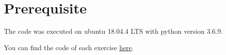 \section*{Prerequisite}
The code was executed on ubuntu 18.04.4 LTS with python version 3.6.9.

You can find the code of each exercise \href{https://github.com/alla1101/-PythonHardWay-}{here}.
